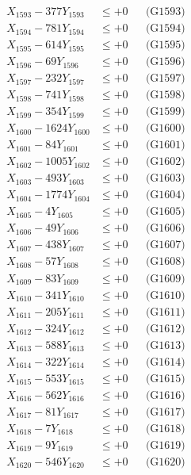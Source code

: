\documentclass[a4paper,10pt]{article}
\begin{document}
{\begin{align}
X_{1593} - 377Y_{1593} &\leq +0 && \text{(G1593)} \\
X_{1594} - 781Y_{1594} &\leq +0 && \text{(G1594)} \\
X_{1595} - 614Y_{1595} &\leq +0 && \text{(G1595)} \\
X_{1596} - 69Y_{1596} &\leq +0 && \text{(G1596)} \\
X_{1597} - 232Y_{1597} &\leq +0 && \text{(G1597)} \\
X_{1598} - 741Y_{1598} &\leq +0 && \text{(G1598)} \\
X_{1599} - 354Y_{1599} &\leq +0 && \text{(G1599)} \\
X_{1600} - 1624Y_{1600} &\leq +0 && \text{(G1600)} \\
\allowbreak
X_{1601} - 84Y_{1601} &\leq +0 && \text{(G1601)} \\
X_{1602} - 1005Y_{1602} &\leq +0 && \text{(G1602)} \\
X_{1603} - 493Y_{1603} &\leq +0 && \text{(G1603)} \\
X_{1604} - 1774Y_{1604} &\leq +0 && \text{(G1604)} \\
X_{1605} - 4Y_{1605} &\leq +0 && \text{(G1605)} \\
X_{1606} - 49Y_{1606} &\leq +0 && \text{(G1606)} \\
X_{1607} - 438Y_{1607} &\leq +0 && \text{(G1607)} \\
X_{1608} - 57Y_{1608} &\leq +0 && \text{(G1608)} \\
X_{1609} - 83Y_{1609} &\leq +0 && \text{(G1609)} \\
X_{1610} - 341Y_{1610} &\leq +0 && \text{(G1610)} \\
\allowbreak
X_{1611} - 205Y_{1611} &\leq +0 && \text{(G1611)} \\
X_{1612} - 324Y_{1612} &\leq +0 && \text{(G1612)} \\
X_{1613} - 588Y_{1613} &\leq +0 && \text{(G1613)} \\
X_{1614} - 322Y_{1614} &\leq +0 && \text{(G1614)} \\
X_{1615} - 553Y_{1615} &\leq +0 && \text{(G1615)} \\
X_{1616} - 562Y_{1616} &\leq +0 && \text{(G1616)} \\
X_{1617} - 81Y_{1617} &\leq +0 && \text{(G1617)} \\
X_{1618} - 7Y_{1618} &\leq +0 && \text{(G1618)} \\
X_{1619} - 9Y_{1619} &\leq +0 && \text{(G1619)} \\
X_{1620} - 546Y_{1620} &\leq +0 && \text{(G1620)} \\

\end{align}}
\end{document}
